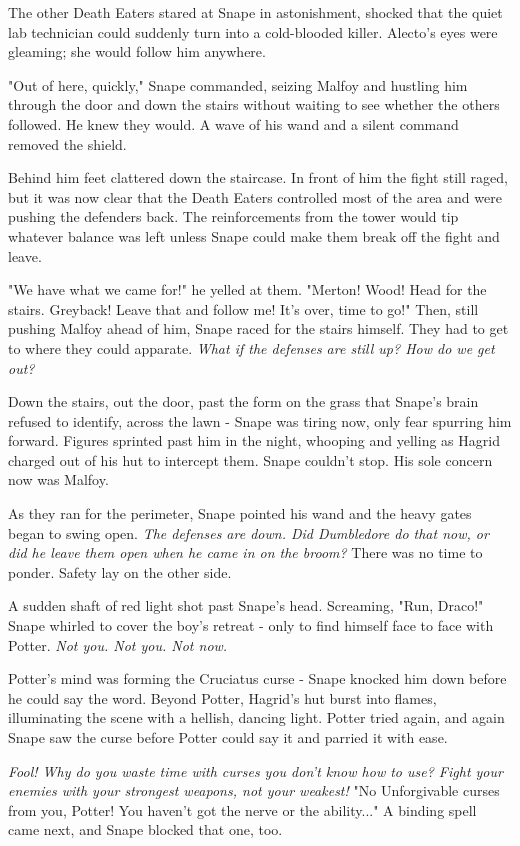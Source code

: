 The other Death Eaters stared at Snape in astonishment, shocked that the quiet lab technician could suddenly turn into a cold-blooded killer. Alecto's eyes were gleaming; she would follow him anywhere.

"Out of here, quickly," Snape commanded, seizing Malfoy and hustling him through the door and down the stairs without waiting to see whether the others followed. He knew they would. A wave of his wand and a silent command removed the shield.

Behind him feet clattered down the staircase. In front of him the fight still raged, but it was now clear that the Death Eaters controlled most of the area and were pushing the defenders back. The reinforcements from the tower would tip whatever balance was left unless Snape could make them break off the fight and leave.

"We have what we came for!" he yelled at them. "Merton! Wood! Head for the stairs. Greyback! Leave that and follow me! It's over, time to go!" Then, still pushing Malfoy ahead of him, Snape raced for the stairs himself. They had to get to where they could apparate. \emph{What if the defenses are still up? How do we get out?}

Down the stairs, out the door, past the form on the grass that Snape's brain refused to identify, across the lawn - Snape was tiring now, only fear spurring him forward. Figures sprinted past him in the night, whooping and yelling as Hagrid charged out of his hut to intercept them. Snape couldn't stop. His sole concern now was Malfoy.

As they ran for the perimeter, Snape pointed his wand and the heavy gates began to swing open. \emph{The defenses are down. Did Dumbledore do that now, or did he leave them open when he came in on the broom?} There was no time to ponder. Safety lay on the other side.

A sudden shaft of red light shot past Snape's head. Screaming, "Run, Draco!" Snape whirled to cover the boy's retreat - only to find himself face to face with Potter. \emph{Not you. Not you. Not now.}

Potter's mind was forming the Cruciatus curse - Snape knocked him down before he could say the word. Beyond Potter, Hagrid's hut burst into flames, illuminating the scene with a hellish, dancing light. Potter tried again, and again Snape saw the curse before Potter could say it and parried it with ease.

\emph{Fool! Why do you waste time with curses you don't know how to use? Fight your enemies with your strongest weapons, not your weakest!} "No Unforgivable curses from you, Potter! You haven't got the nerve or the ability..." A binding spell came next, and Snape blocked that one, too.

